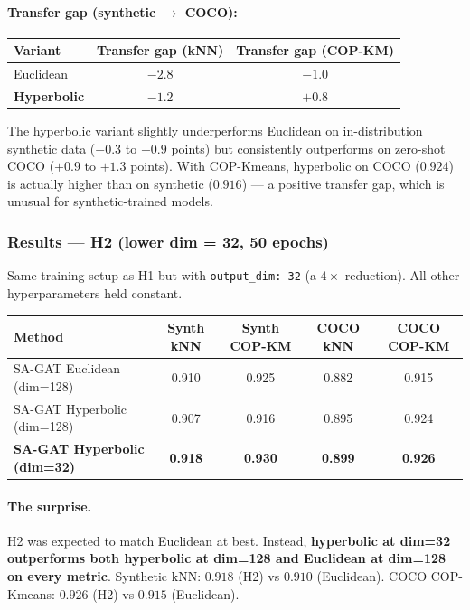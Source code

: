 \paragraph{Transfer gap (synthetic $\to$ COCO):}

\begin{tabular}{lcc}
\hline
\textbf{Variant} & \textbf{Transfer gap (kNN)} & \textbf{Transfer gap (COP-KM)} \\
\hline
Euclidean & $-2.8$ & $-1.0$ \\
\textbf{Hyperbolic} & $-1.2$ & $\mathbf{+0.8}$ \\
\hline
\end{tabular}

\vspace{0.5em}

The hyperbolic variant slightly underperforms Euclidean on in-distribution synthetic data ($-0.3$ to $-0.9$ points) but consistently outperforms on zero-shot COCO ($+0.9$ to $+1.3$ points). With COP-Kmeans, hyperbolic on COCO ($0.924$) is actually higher than on synthetic ($0.916$) --- a positive transfer gap, which is unusual for synthetic-trained models.

\subsubsection{Results --- H2 (lower dim = 32, 50 epochs)}

Same training setup as H1 but with \texttt{output\_dim: 32} (a $4\times$ reduction). All other hyperparameters held constant.

\begin{tabular}{lcccc}
\hline
\textbf{Method} & \textbf{Synth kNN} & \textbf{Synth COP-KM} & \textbf{COCO kNN} & \textbf{COCO COP-KM} \\
\hline
SA-GAT Euclidean (dim=128) & 0.910 & 0.925 & 0.882 & 0.915 \\
SA-GAT Hyperbolic (dim=128) & 0.907 & 0.916 & 0.895 & 0.924 \\
\textbf{SA-GAT Hyperbolic (dim=32)} & \textbf{0.918} & \textbf{0.930} & \textbf{0.899} & \textbf{0.926} \\
\hline
\end{tabular}

\vspace{0.5em}

\paragraph{The surprise.} H2 was expected to match Euclidean at best. Instead, \textbf{hyperbolic at dim=32 outperforms both hyperbolic at dim=128 and Euclidean at dim=128 on every metric}. Synthetic kNN: $0.918$ (H2) vs $0.910$ (Euclidean). COCO COP-Kmeans: $0.926$ (H2) vs $0.915$ (Euclidean).

